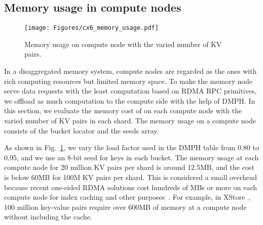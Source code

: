 \vspace{-1.5ex}
\subsection{Memory usage in compute nodes}
\label{sec:eval:mem}

\begin{figure}[t]
\centering
\hspace{-.5ex}
    \texttt{[image: Figures/cx6\_memory\_usage.pdf]}
    \vspace{-3ex}
    \caption{Memory usage on compute node with the varied number of KV pairs.}
    \label{fig:eval:mem}
    \vspace{-4ex}
\end{figure}

In a disaggregated memory system, compute nodes are regarded as the ones with rich computing resources but limited memory space. 
To make the memory node serve data requests with the least computation based on RDMA RPC primitives, we offload as much computation to the compute side with the help of DMPH.
In this section, we evaluate the memory cost of \sys on each compute node with the varied number of KV pairs in each shard. The memory usage on a compute node consists of the bucket locator and the seeds array.

As shown in Fig.~\ref{fig:eval:mem}, we vary the load factor used in the DMPH table from 0.80 to 0.95, and we use an 8-bit seed for keys in each bucket. The memory usage at each compute node for 20 million KV pairs per shard is around 12.5MB, and the cost is below 60MB for 100M KV pairs per shard.  
This is considered a small overhead because recent one-sided RDMA solutions cost hundreds of MBs or more on each compute node for index caching and other purposes~\cite{rolex,xtore}. 
For example, in XStore~\cite{xtore}, 100 million key-value pairs require over 600MB of memory at a compute node without including the cache.










